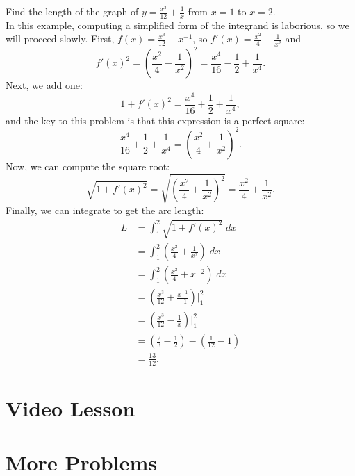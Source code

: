\documentclass{ximera}
\begin{document}
\begin{example} Find the length of the graph of 
$y = \frac{x^3}{12} + \frac{1}{x}$ from $x = 1$ to $x = 2$.\\
In this example, computing a simplified form of the integrand is laborious, so we will proceed slowly.
First, $f(x) = \frac{x^3}{12} + x^{-1}$, so $f'(x) = \frac{x^2}{4} - \frac{1}{x^2}$ and
\[
f'(x)^2 = \left( \frac{x^2}{4} - \frac{1}{x^2} \right)^2 = \frac{x^4}{16} - \frac12 + \frac{1}{x^4}.
\]
Next, we add one:
\[
1 + f'(x)^2 = \frac{x^4}{16} + \frac12 + \frac{1}{x^4},
\]
and the key to this problem is that this expression is a perfect square:
\[
\frac{x^4}{16} + \frac12 + \frac{1}{x^4} = \left( \frac{x^2}{4} + \frac{1}{x^2}\right)^2.
\]
Now, we can compute the square root:
\[
\sqrt{1+f'(x)^2} = \sqrt{\left( \frac{x^2}{4} + \frac{1}{x^2}\right)^2 } = \frac{x^2}{4} + \frac{1}{x^2}.
\]
Finally, we can integrate to get the arc length:
\begin{align*}
L &= \int_1^2 \sqrt{1+f'(x)^2} \; dx \\
  &= \int_1^2 \left(\frac{x^2}{4} + \frac{1}{x^2} \right) \; dx  \\
  &= \int_1^2 \left(\frac{x^2}{4} + x^{-2} \right) \; dx \\
  &= \left(\frac{x^3}{12} + \frac{x^{-1}}{-1} \right) \bigg|_1^2 \\
  &= \left(\frac{x^3}{12} - \frac{1}{x} \right) \bigg|_1^2 \\
  &= \left(\frac23 - \frac12\right) - \left(\frac{1}{12} - 1\right) \\
  &= \frac{13}{12}.  
\end{align*}
\end{example}


\section{Video Lesson}


\begin{center}
\begin{foldable}
\end{foldable}
\end{center}

\section{More Problems}
\end{document}
